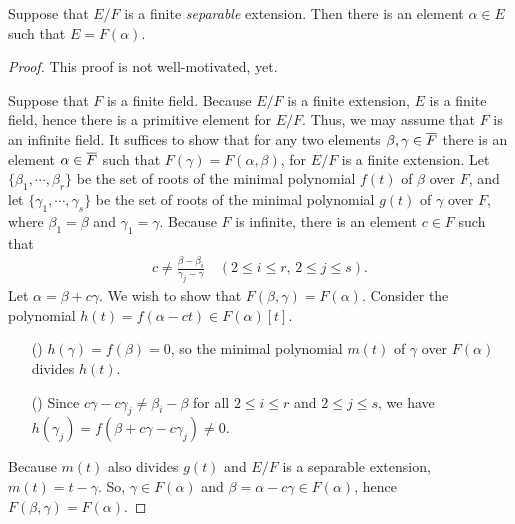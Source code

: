 \begin{thm}\label{primitive element theorem}
    Suppose that $E/F$ is a finite \textit{separable} extension.
    Then there is an element $\alpha\in E$ such that $E=F(\alpha)$.
\end{thm}
\begin{proof}
    \color{teal}This proof is not well-motivated, yet.\color{black}

    Suppose that $F$ is a finite field.
    Because $E/F$ is a finite extension, $E$ is a finite field, hence there is a primitive element for $E/F$.
    Thus, we may assume that $F$ is an infinite field.
    It suffices to show that for any two elements $\beta, \gamma\in \overline{F}$ there is an element $\alpha\in \overline{F}$ such that $F(\gamma)=F(\alpha, \beta)$, for $E/F$ is a finite extension.
    Let $\{\beta_1, \cdots, \beta_r\}$ be the set of roots of the minimal polynomial $f(t)$ of $\beta$ over $F$, and let $\{\gamma_1, \cdots, \gamma_s\}$ be the set of roots of the minimal polynomial $g(t)$ of $\gamma$ over $F$, where $\beta_1=\beta$ and $\gamma_1=\gamma$.
    Because $F$ is infinite, there is an element $c\in F$ such that
    \begin{align*}
        c\neq\frac{\beta-\beta_i}{\gamma_j-\gamma}\quad(2\leq i\leq r,\,2\leq j\leq s).
    \end{align*}
    Let $\alpha=\beta+c\gamma$.
    We wish to show that $F(\beta, \gamma)=F(\alpha)$.
    Consider the polynomial $h(t)=f(\alpha-ct)\in F(\alpha)[t]$.
    \begin{enumerate}
        \item[(\romannumeral 1)]
        {
            $h(\gamma)=f(\beta)=0$, so the minimal polynomial $m(t)$ of $\gamma$ over $F(\alpha)$ divides $h(t)$.
        }
        \item[(\romannumeral 2)]
        {
            Since $c\gamma-c\gamma_j\neq\beta_i-\beta$ for all $2\leq i\leq r$ and $2\leq j\leq s$, we have $h(\gamma_j)=f(\beta+c\gamma-c\gamma_j)\neq 0$.
        }
    \end{enumerate}
    Because $m(t)$ also divides $g(t)$ and $E/F$ is a separable extension, $m(t)=t-\gamma$.
    So, $\gamma\in F(\alpha)$ and $\beta=\alpha-c\gamma\in F(\alpha)$, hence $F(\beta, \gamma)=F(\alpha)$.
\end{proof}
